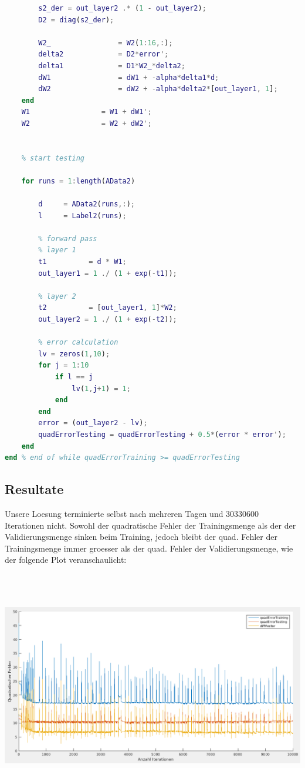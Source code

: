 \documentclass[12pt]{article}
\begin{document}
\begin{lstlisting}[language=Matlab]
        % backward pass - layer 2
        s2_der = out_layer2 .* (1 - out_layer2);
        D2 = diag(s2_der);
        
        W2_                = W2(1:16,:);
        delta2             = D2*error';
        delta1             = D1*W2_*delta2;
        dW1                = dW1 + -alpha*delta1*d;
        dW2                = dW2 + -alpha*delta2*[out_layer1, 1];
    end
    W1                 = W1 + dW1';
    W2                 = W2 + dW2';
    
    
    % start testing
    
    for runs = 1:length(AData2)
        
        d     = AData2(runs,:);
        l     = Label2(runs);
            
        % forward pass
        % layer 1
        t1          = d * W1;
        out_layer1 = 1 ./ (1 + exp(-t1));
        
        % layer 2
        t2          = [out_layer1, 1]*W2;
        out_layer2 = 1 ./ (1 + exp(-t2));
        
        % error calculation
        lv = zeros(1,10);
        for j = 1:10
            if l == j
                lv(1,j+1) = 1;
            end
        end
        error = (out_layer2 - lv);
        quadErrorTesting = quadErrorTesting + 0.5*(error * error');
    end
end % end of while quadErrorTraining >= quadErrorTesting
\end{lstlisting}

\subsection{Resultate}
Unsere Loesung terminierte selbst nach mehreren Tagen und 30330600 Iterationen nicht. Sowohl der quadratische Fehler der Trainingsmenge als der der Validierungsmenge sinken beim Training, jedoch bleibt der quad. Fehler der Trainingsmenge immer groesser als der quad. Fehler der Validierungsmenge, wie der folgende Plot veranschaulicht:\\
\begin{center}
\includegraphics[width=13.5cm,height=10cm]{errorplot_aufg1a_10000_iter_quaddiff.png}
\end{center}
\newpage
\end{document}
